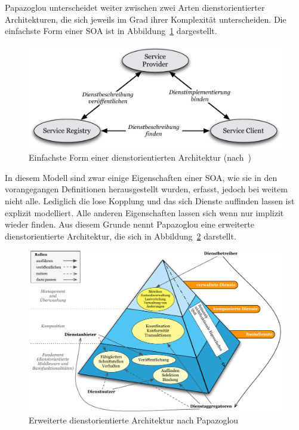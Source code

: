   Papazoglou unterscheidet weiter zwischen zwei Arten dienstorientierter Architekturen, die sich jeweils im Grad ihrer Komplexität unterscheiden. Die einfachste Form einer SOA ist in Abbildung~\ref{fig:images_Basic_SOA} dargestellt.

  \begin{figure}[!ht]
    \centering
      \includegraphics[width=.9\textwidth]{images/Basic_SOA.pdf}
    \caption{Einfachste Form einer dienstorientierten Architektur (nach~\citep{service_oriented_computing})}
    \label{fig:images_Basic_SOA}
  \end{figure}

  In diesem Modell sind zwar einige Eigenschaften einer SOA, wie sie in den vorangegangen Definitionen herausgestellt wurden, erfasst, jedoch bei weitem nicht alle. Lediglich die lose Kopplung und das sich Dienste auffinden lassen ist explizit modelliert. Alle anderen Eigenschaften lassen sich wenn nur implizit wieder finden. Aus diesem Grunde nennt Papazoglou eine erweiterte dienstorientierte Architektur, die sich in Abbildung~\ref{fig:images_Extended_SOA} darstellt.

  \begin{figure}[!hb]
    \centering
      \includegraphics[width=.9\textwidth]{images/Extended_SOA.pdf}
    \caption{Erweiterte dienstorientierte Architektur nach Papazoglou~\citep{papazoglou2007soc}}
    \label{fig:images_Extended_SOA}
  \end{figure}

